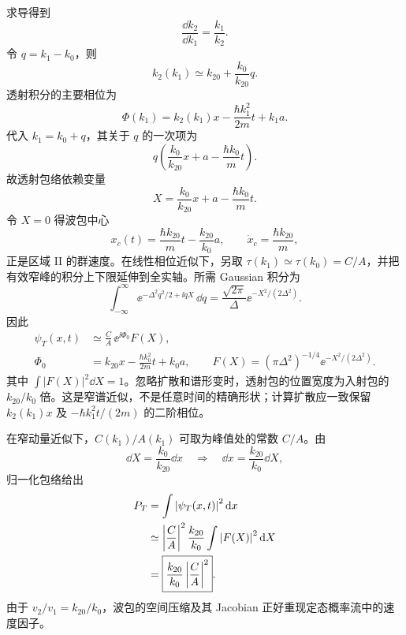 \begin{checkedsolution}
求导得到
\begin{equation}
  \frac{\dd k_2}{\dd k_1}=\frac{k_1}{k_2}.
  \label{eq:QM-C05-S04-E01-derivative}
\end{equation}
令 $q=k_1-k_0$，则
\begin{equation}
  k_2(k_1)
  \simeq k_{20}+\frac{k_0}{k_{20}}q.
  \label{eq:QM-C05-S04-E01-linearization}
\end{equation}
透射积分的主要相位为
\begin{equation}
  \Phi(k_1)=k_2(k_1)x
  -\frac{\hbar k_1^2}{2m}t+k_1a.
  \label{eq:QM-C05-S04-E01-phase}
\end{equation}
代入 $k_1=k_0+q$，其关于 $q$ 的一次项为
\begin{equation}
  q\left(
    \frac{k_0}{k_{20}}x+a-\frac{\hbar k_0}{m}t
  \right).
  \label{eq:QM-C05-S04-E01-linear-phase}
\end{equation}
故透射包络依赖变量
\begin{equation}
  X=\frac{k_0}{k_{20}}x+a-\frac{\hbar k_0}{m}t.
  \label{eq:QM-C05-S04-E01-envelope-variable}
\end{equation}
令 $X=0$ 得波包中心
\begin{equation}
  x_c(t)=\frac{\hbar k_{20}}m t-\frac{k_{20}}{k_0}a,
  \qquad
  \dot x_c=\frac{\hbar k_{20}}m,
  \label{eq:QM-C05-S04-E01-center}
\end{equation}
正是区域 II 的群速度。在线性相位近似下，另取 $\tau(k_1)\simeq\tau(k_0)=C/A$，并把有效窄峰的积分上下限延伸到全实轴。所需 Gaussian 积分为
\begin{equation}
  \int_{-\infty}^{\infty}
  \ee^{-\Delta^2q^2/2+\ii qX}\,\dd q
  =\frac{\sqrt{2\pi}}{\Delta}\ee^{-X^2/(2\Delta^2)}.
\end{equation}
因此
\begin{align}
  \psi_T(x,t)&\simeq\frac CA\,\ee^{\ii\Phi_0}F(X),\\
  \Phi_0&=k_{20}x-\frac{\hbar k_0^2}{2m}t+k_0a,\qquad
  F(X)=(\pi\Delta^2)^{-1/4}\ee^{-X^2/(2\Delta^2)}.
\end{align}
其中 $\int|F(X)|^2\dd X=1$。忽略扩散和谱形变时，透射包的位置宽度为入射包的 $k_{20}/k_0$ 倍。这是窄谱近似，不是任意时间的精确形状；计算扩散应一致保留 $k_2(k_1)x$ 及 $-\hbar k_1^2t/(2m)$ 的二阶相位。

在窄动量近似下，$C(k_1)/A(k_1)$ 可取为峰值处的常数 $C/A$。由
\begin{equation}
  \dd X=\frac{k_0}{k_{20}}\dd x
  \quad\Longrightarrow\quad
  \dd x=\frac{k_{20}}{k_0}\dd X,
  \label{eq:QM-C05-S04-E01-jacobian}
\end{equation}
归一化包络给出
\begin{align}
  P_T
  &=\int\left|\psi_T(x,t)\right|^2\mathop{}\!\mathrm{d} x\\
  &\simeq\left|\frac CA\right|^2
    \frac{k_{20}}{k_0}
    \int\left|F(X)\right|^2\mathop{}\!\mathrm{d} X\\
  &=\boxed{
    \frac{k_{20}}{k_0}\left|\frac CA\right|^2}.
  \label{eq:QM-C05-S04-E01-transmission}
\end{align}
由于 $v_2/v_1=k_{20}/k_0$，波包的空间压缩及其 Jacobian 正好重现定态概率流中的速度因子。


\end{checkedsolution}
